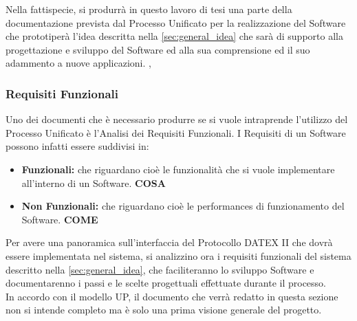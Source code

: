 Nella fattispecie, si produrrà in questo lavoro di tesi una parte della documentazione prevista dal Processo Unificato per la realizzazione del Software che prototiperà l'idea descritta nella \autoref{sec:general_idea} che sarà di supporto alla progettazione e sviluppo del Software ed alla sua comprensione ed il suo adammento a nuove applicazioni. \cite{book:slide_Nocera}, \cite{book:software_engineering}

\subsubsection{Requisiti Funzionali}
Uno dei documenti che è necessario produrre se si vuole intraprende l'utilizzo del Processo Unificato è l'Analisi dei Requisiti Funzionali. I Requisiti di un Software possono infatti essere suddivisi in:
\begin{itemize}
	\item \textbf{Funzionali: }che riguardano cioè le funzionalità che si vuole implementare all'interno di un Software. \textbf{COSA}
	\item \textbf{Non Funzionali: }che riguardano cioè le performances di funzionamento del Software. \textbf{COME}
\end{itemize}
Per avere una panoramica sull'interfaccia del Protocollo DATEX II che dovrà essere implementata nel sistema, si analizzino ora i requisiti funzionali del sistema descritto nella \autoref{sec:general_idea}, che faciliteranno lo sviluppo Software e documentarenno i passi e le scelte progettuali effettuate durante il processo.\\
In accordo con il modello UP, il documento che verrà redatto in questa sezione non si intende completo ma è solo una prima visione generale del progetto. 
